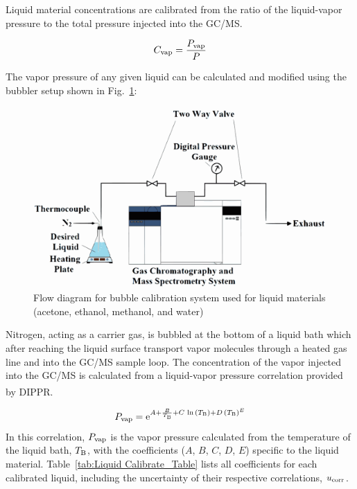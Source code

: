 \documentclass[12pt]{article}
\begin{document}
Liquid material concentrations are calibrated from the ratio of the liquid-vapor pressure to the total pressure injected into the GC/MS.

\begin{equation}
\label{eq:liquid_vapor_concentration}
C_{\rm vap} =\frac {P_{\rm vap}}{P}
\end{equation}

The vapor pressure of any given liquid can be calculated and modified using the bubbler setup shown in Fig.~\ref{fig:Bubbler}:

\begin{figure}[h!]
	\centering
\includegraphics[width=\textwidth,keepaspectratio]{Bubbler_Setup.png}
	\caption[Flow diagram for bubble calibration system used for liquid materials]{Flow diagram for bubble calibration system used for liquid materials (acetone, ethanol, methanol, and water)}
	\label{fig:Bubbler}
\end{figure}
Nitrogen, acting as a carrier gas, is bubbled at the bottom of a liquid bath which after reaching the liquid surface transport vapor molecules through a heated gas line and into the GC/MS sample loop. The concentration of the vapor injected into the GC/MS is calculated from a liquid-vapor pressure correlation provided by DIPPR\textsuperscript{\textregistered}.

\begin{equation}
\label{eq:liquid_vapor_pressure_correlation}
P_{\rm vap} ={\rm e}^{A+\frac{B}{T_{\rm B}}+C\,\ln{(T_{\rm B})}+D\,(T_{\rm B})^{E}}
\end{equation}
In this correlation, $P_{\rm vap}$ is the vapor pressure calculated from the temperature of the liquid bath, $T_{\rm B}$, with the coefficients ($A$, $B$, $C$, $D$, $E$) specific to the liquid material. Table~\ref{tab:Liquid Calibrate_Table} lists all coefficients for each calibrated liquid, including the uncertainty of their respective correlations, $u_{\rm corr}$.
\end{document}
